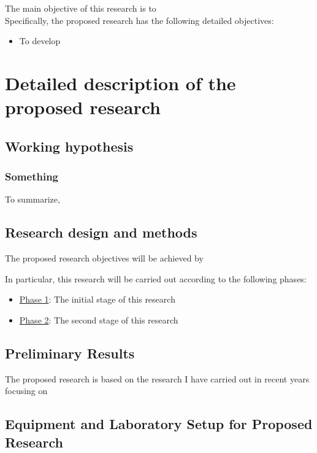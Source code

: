 \documentclass[a4paper,11pt]{article}
\begin{document}
The main objective of this research is to
\\

\noindent Specifically, the proposed research has the following detailed objectives:
\begin{itemize}
    \item To develop
\end{itemize}

\section{Detailed description of the proposed research}

\subsection{Working hypothesis}
\label{sec:hypothesis}

\subsubsection{Something }

To summarize,

\subsection{Research design and methods}
\label{sec:methods}

The proposed research objectives will be achieved by

In particular, this research will be carried out according to the following phases:
\begin{itemize}
    \item \underline{Phase 1}: The initial stage of this research
    \item \underline{Phase 2}: The second stage of this research
\end{itemize}

\subsection{Preliminary Results}
\label{sec:preliminary_results}

The proposed research is based on the research I have carried out in recent years focusing on


\subsection{Equipment and Laboratory Setup for Proposed Research}
\label{sec:equipment}


\newpage
\singlespacing

\end{document}
